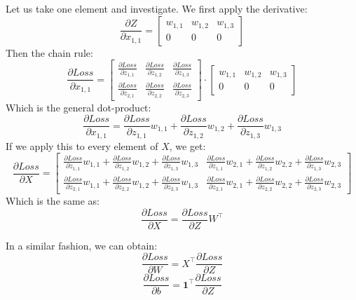\documentclass[11pt]{article}
\begin{document}
Let us take one element and investigate.
We first apply the derivative:
\[
  \frac{\partial Z}{\partial x_{1, 1}} = \begin{bmatrix}
    w_{1, 1} & w_{1, 2} & w_{1, 3} \\
    0 & 0 & 0
  \end{bmatrix}
\]
Then the chain rule:
\[
  \frac{\partial Loss}{\partial x_{1, 1}} = \begin{bmatrix}
    \frac{\partial Loss}{\partial z_{1, 1}} &
    \frac{\partial Loss}{\partial z_{1, 2}} &
    \frac{\partial Loss}{\partial z_{1, 3}} \\
    \frac{\partial Loss}{\partial z_{2, 1}} &
    \frac{\partial Loss}{\partial z_{2, 2}} &
    \frac{\partial Loss}{\partial z_{2, 3}}
  \end{bmatrix}
  \cdot
  \begin{bmatrix}
    w_{1, 1} & w_{1, 2} & w_{1, 3} \\
    0 & 0 & 0
  \end{bmatrix}
\]
Which is the general dot-product:
\[
  \frac{\partial Loss}{\partial x_{1, 1}} = 
  \frac{\partial Loss}{\partial z_{1,1}}w_{1,1} +
  \frac{\partial Loss}{\partial z_{1,2}}w_{1,2} +
  \frac{\partial Loss}{\partial z_{1,3}}w_{1,3}
\]
If we apply this to every element of $X$, we get:
\[
  \frac{\partial Loss}{\partial X} =
  \begin{bmatrix}
  \frac{\partial Loss}{\partial z_{1,1}}w_{1,1} + \frac{\partial Loss}{\partial z_{1,2}}w_{1,2} + \frac{\partial Loss}{\partial z_{1,3}}w_{1,3}
  &
  \frac{\partial Loss}{\partial z_{1,1}}w_{2,1} + \frac{\partial Loss}{\partial z_{1,2}}w_{2,2} + \frac{\partial Loss}{\partial z_{1,3}}w_{2,3} \\
  \frac{\partial Loss}{\partial z_{2,1}}w_{1,1} + \frac{\partial Loss}{\partial z_{2,2}}w_{1,2} + \frac{\partial Loss}{\partial z_{2,3}}w_{1,3}
  &
  \frac{\partial Loss}{\partial z_{2,1}}w_{2,1} + \frac{\partial Loss}{\partial z_{2,2}}w_{2,2} + \frac{\partial Loss}{\partial z_{2,3}}w_{2,3}
  \end{bmatrix}
\]
Which is the same as:
\[
  \frac{\partial Loss}{\partial X} = \frac{\partial Loss}{\partial Z}W^\intercal 
\]

In a similar fashion, we can obtain:
\[
  \frac{\partial Loss}{\partial W} = X^\intercal\frac{\partial Loss}{\partial Z}
\]
\[
  \frac{\partial Loss}{\partial b} = \textbf{1}^\intercal\frac{\partial Loss}{\partial Z}
\]
\end{document}

